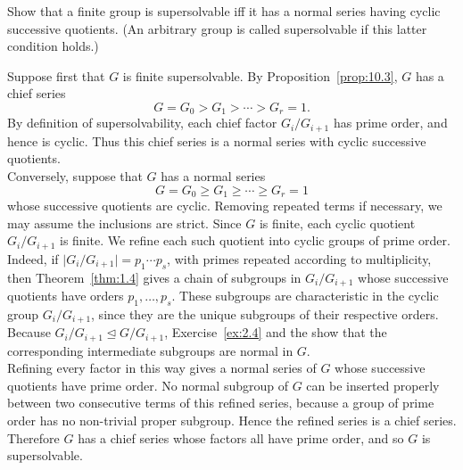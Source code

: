\documentclass[../Odyssey_Project.tex]{subfiles}
\begin{document}
\begin{exercise}
\label{ex:11.6}
Show that a finite group is supersolvable iff it has a normal series having cyclic successive quotients. (An arbitrary group is called supersolvable if this latter condition holds.)
\end{exercise}
\begin{solution}
    Suppose first that $G$ is finite supersolvable. By Proposition~\ref{prop:10.3}, $G$ has a chief series
    \[
        G=G_0>G_1>\cdots>G_r=1.
    \]
    By definition of supersolvability, each chief factor $G_i/G_{i+1}$ has prime order, and hence is cyclic. Thus this chief series is a normal series with cyclic successive quotients.\\
    Conversely, suppose that $G$ has a normal series
    \[
        G=G_0\geq G_1\geq \cdots \geq G_r=1
    \]
    whose successive quotients are cyclic. Removing repeated terms if necessary, we may assume the inclusions are strict. Since $G$ is finite, each cyclic quotient $G_i/G_{i+1}$ is finite. We refine each such quotient into cyclic groups of prime order. Indeed, if $\lvert G_i/G_{i+1}\rvert=p_1\cdots p_s$, with primes repeated according to multiplicity, then Theorem~\ref{thm:1.4} gives a chain of subgroups in $G_i/G_{i+1}$ whose successive quotients have orders $p_1,\ldots,p_s$. These subgroups are characteristic in the cyclic group $G_i/G_{i+1}$, since they are the unique subgroups of their respective orders. Because $G_i/G_{i+1}\trianglelefteq G/G_{i+1}$, Exercise~\ref{ex:2.4} and the  show that the corresponding intermediate subgroups are normal in $G$.\\
    Refining every factor in this way gives a normal series of $G$ whose successive quotients have prime order. No normal subgroup of $G$ can be inserted properly between two consecutive terms of this refined series, because a group of prime order has no non-trivial proper subgroup. Hence the refined series is a chief series. Therefore $G$ has a chief series whose factors all have prime order, and so $G$ is supersolvable.
\end{solution}
\end{document}
